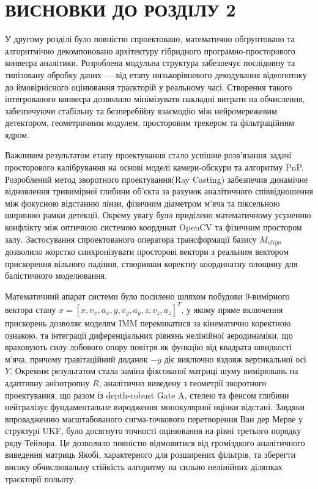 \begin{unnumbered}

\section*{ВИСНОВКИ ДО РОЗДІЛУ 2}

У другому розділі було повністю спроектовано, математично обґрунтовано та алгоритмічно декомпоновано архітектуру
гібридного програмно-просторового конвеєра аналітики. Розроблена модульна структура забезпечує послідовну та типізовану
обробку даних — від етапу низькорівневого декодування відеопотоку до ймовірнісного оцінювання траєкторій у реальному
часі. Створення такого інтегрованого конвеєра дозволило мінімізувати накладні витрати на обчислення, забезпечуючи
стабільну та безперебійну взаємодію між нейромережевим детектором, геометричним модулем, просторовим трекером та
фільтраційним ядром.

Важливим результатом етапу проектування стало успішне розв'язання задачі просторового калібрування на основі моделі
камери-обскури та алгоритму \gls{PnP}. Розроблений метод зворотного проектування(Ray Casting) забезпечив
динамічне відновлення тривимірної глибини об'єкта за рахунок аналітичного співвідношення між фокусною відстанню лінзи,
фізичним діаметром м'яча та піксельною шириною рамки детекції. Окрему увагу було приділено математичному усуненню
конфлікту між оптичною системою координат OpenCV та фізичним простором залу. Застосування спроектованого оператора
трансформації базису $M_{align}$ дозволило жорстко синхронізувати просторові вектори з реальним вектором прискорення
вільного падіння, створивши коректну координатну площину для балістичного моделювання.

Математичний апарат системи було посилено шляхом побудови 9-вимірного вектора стану
$x = [x, v_x, a_x, y, v_y, a_y, z, v_z, a_z]^T$, у якому пряме включення прискорень дозволяє моделям \gls{IMM}
перемикатися за кінематично коректною ознакою, та інтеграції диференціальних рівнянь нелінійної аеродинаміки, що
враховують силу лобового опору повітря як функцію від квадрата швидкості м'яча, причому гравітаційний доданок $-g$ діє
виключно вздовж вертикальної осі $Y$. Окремим результатом стала заміна фіксованої матриці шуму вимірювань на адаптивну
анізотропну $R$, аналітично виведену з геометрії зворотного проектування, що разом із depth-robust Gate A, стелею та
фенсом глибини нейтралізує фундаментальне виродження монокулярної оцінки відстані.
Завдяки впровадженню масштабованого сигма-точкового перетворення Ван дер Мерве у структурі \gls{UKF},
було досягнуто точності оцінювання на рівні третього порядку ряду Тейлора. Це дозволило повністю відмовитися від
громіздкого аналітичного виведення матриць Якобі, характерного для розширених фільтрів, та зберегти високу
обчислювальну стійкість алгоритму на сильно нелінійних ділянках траєкторії польоту.


\end{unnumbered}
